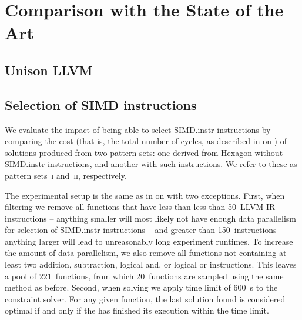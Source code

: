 %

\chapter{Comparison with the State of the Art}



\section{Unison \versus LLVM}



\section{Selection of SIMD instructions}

\def\patternSetA{\textsc{i}}
\def\patternSetB{\textsc{ii}}

We evaluate the impact of being able to select \gls{SIMD.instr}
\glspl{instruction} by comparing the cost (that is, the total number of cycles,
as described in  on
) of \glspl{solution} produced from two
\glspl{pattern set}: one derived from \gls{Hexagon} without \gls{SIMD.instr}
\glspl{instruction}, and another with such \glspl{instruction}.
%
We refer to these as \glspl{pattern set}~\patternSetA{} and~\patternSetB,
respectively.

The experimental setup is the same as in
 on
 with two exceptions.
%
First, when filtering we remove all \glspl{function} that have less than less
than \num{50}~\gls{LLVM} \gls{IR} \glspl{instruction} -- anything smaller will
most likely not have enough data parallelism for selection of \gls{SIMD.instr}
\glspl{instruction} -- and greater than \num{150}~\glspl{instruction} --
anything larger will lead to unreasonably long experiment runtimes.
%
To increase the amount of data parallelism, we also remove all \glspl{function}
not containing at least two addition, subtraction, logical and, or logical or
\glspl{instruction}.
%
This leaves a pool of \num{221}~\glspl{function}, from which
\num{20}~\glspl{function} are sampled using the same method as before.
%
Second, when solving we apply time limit of \SI{600}{\s} to the \gls{constraint
  solver}.
%
For any given \gls{function}, the last \gls{solution} found is considered
optimal if and only if the  has finished its
execution within the time limit.

